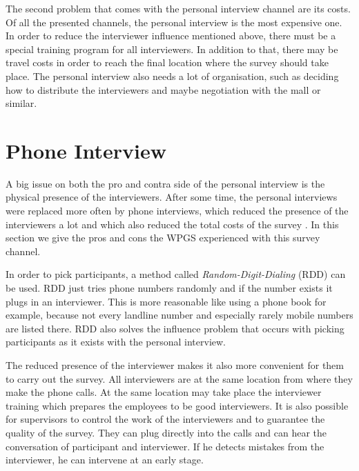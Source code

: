 \documentclass{report}
\begin{document}
The second problem that comes with the personal interview channel are its costs. Of all the presented channels, the personal interview is the most expensive one. In order to reduce the interviewer influence mentioned above, there must be a special training program for all interviewers. In addition to that, there may be travel costs in order to reach the final location where the survey should take place. The personal interview also needs a lot of organisation, such as deciding how to distribute the interviewers and maybe negotiation with the mall or similar.

\section{Phone Interview}

A big issue on both the pro and contra side of the personal interview is the physical presence of the interviewers. After some time, the personal interviews were replaced more often by phone interviews, which reduced the presence of the interviewers a lot and which also reduced the total costs of the survey \cite{cph}. In this section we give the pros and cons the WPGS \cite{cph} experienced with this survey channel.

In order to pick participants, a method called \textit{Random-Digit-Dialing} (RDD) can be used. RDD just tries phone numbers randomly and if the number exists it plugs in an interviewer. This is more reasonable like using a phone book for example, because not every landline number and especially rarely mobile numbers are listed there. RDD also solves the influence problem that occurs with picking participants as it exists with the personal interview.

The reduced presence of the interviewer makes it also more convenient for them to carry out the survey. All interviewers are at the same location from where they make the phone calls. At the same location may take place the interviewer training which prepares the employees to be good interviewers. It is also possible for supervisors to control the work of the interviewers and to guarantee the quality of the survey. They can plug directly into the calls and can hear the conversation of participant and interviewer. If he detects mistakes from the interviewer, he can intervene at an early stage.
\end{document}
